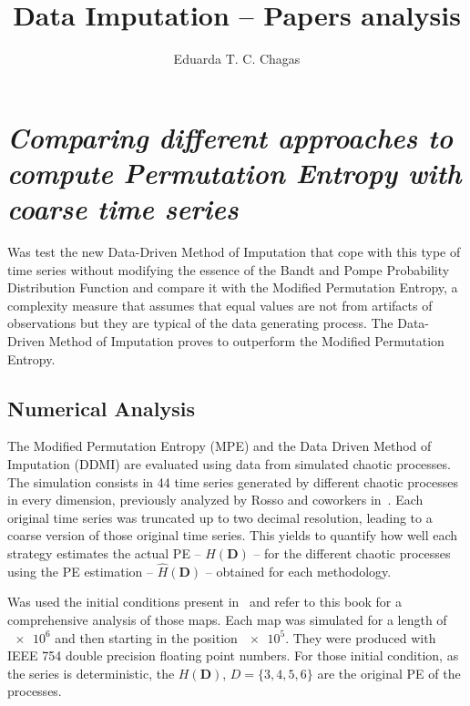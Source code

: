 \documentclass[11pt]{article}
\title{Data Imputation -- Papers analysis}
\author{Eduarda T. C. Chagas}
\begin{document}
 

\maketitle

\section*{\textbf{\textit{Comparing different approaches to compute Permutation Entropy with coarse time series}}~\cite{traversaro2019comparing}}

Was test the new Data-Driven Method of Imputation that cope with this type of time series without modifying the essence of the Bandt and Pompe Probability Distribution Function and compare it with the Modified Permutation Entropy, a complexity measure that assumes that equal values are not from artifacts of observations but they are typical of the data generating process. 
The Data-Driven Method of Imputation proves to outperform the Modified Permutation Entropy.

\subsection*{Numerical Analysis}

The Modified Permutation Entropy (MPE) and the Data Driven Method of Imputation (DDMI) are evaluated using data from simulated chaotic processes. 
The simulation consists in 44 time series generated by different chaotic processes in every dimension, previously analyzed by Rosso and coworkers in~. 
Each original time series was truncated up to two decimal resolution, leading to a coarse version of those original time series.
This yields to quantify how well each strategy estimates the actual PE -- $H(\bm D)$ -- for the different chaotic processes using the PE estimation -- $\hat{H}(\bm D)$ -- obtained for each methodology.

Was used the initial conditions present in~\cite{sprott2003chaos} and refer to this book for a comprehensive analysis of those maps. 
Each map was simulated for a length of $\num[scientific-notation=true]{e6}$ and then starting in the position $\num[scientific-notation=true]{e5}$.
They were produced with IEEE 754 double precision floating point numbers.
For those initial condition, as the series is deterministic, the $H(\bm D)$, $D = \{ 3, 4, 5, 6 \}$ are the original PE of the processes.
\end{document}
